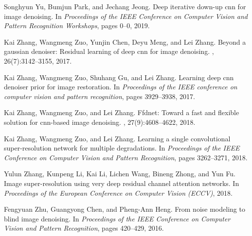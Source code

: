 \documentclass[10pt,twocolumn,letterpaper]{article}
\begin{document}
{\begin{thebibliography}{10}
	Songhyun Yu, Bumjun Park, and Jechang Jeong.
	\newblock Deep iterative down-up cnn for image denoising.
	\newblock In {\em Proceedings of the IEEE Conference on Computer Vision and
		Pattern Recognition Workshops}, pages 0--0, 2019.
	
	Kai Zhang, Wangmeng Zuo, Yunjin Chen, Deyu Meng, and Lei Zhang.
	\newblock Beyond a gaussian denoiser: Residual learning of deep cnn for image
	denoising.
	, 26(7):3142--3155, 2017.
	
	Kai Zhang, Wangmeng Zuo, Shuhang Gu, and Lei Zhang.
	\newblock Learning deep cnn denoiser prior for image restoration.
	\newblock In {\em Proceedings of the IEEE conference on computer vision and
		pattern recognition}, pages 3929--3938, 2017.
	
	Kai Zhang, Wangmeng Zuo, and Lei Zhang.
	\newblock Ffdnet: Toward a fast and flexible solution for cnn-based image
	denoising.
	, 27(9):4608--4622, 2018.
	
	Kai Zhang, Wangmeng Zuo, and Lei Zhang.
	\newblock Learning a single convolutional super-resolution network for multiple
	degradations.
	\newblock In {\em Proceedings of the IEEE Conference on Computer Vision and
		Pattern Recognition}, pages 3262--3271, 2018.
	
	Yulun Zhang, Kunpeng Li, Kai Li, Lichen Wang, Bineng Zhong, and Yun Fu.
	\newblock Image super-resolution using very deep residual channel attention
	networks.
	\newblock In {\em Proceedings of the European Conference on Computer Vision
		(ECCV)}, 2018.
	
	Fengyuan Zhu, Guangyong Chen, and Pheng-Ann Heng.
	\newblock From noise modeling to blind image denoising.
	\newblock In {\em Proceedings of the IEEE Conference on Computer Vision and
		Pattern Recognition}, pages 420--429, 2016.
	
\end{thebibliography}

}
\end{document}
